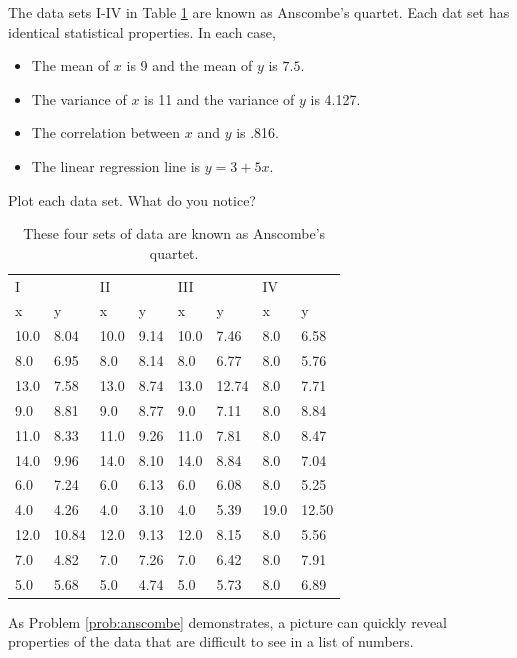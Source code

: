 \begin{problem}\label{prob:anscombe}
The data sets I-IV in Table \ref{table:anscombe} are known as Anscombe's quartet. 
Each dat set has identical statistical properties. 
In each case,
\begin{itemize}
\item The mean of $x$ is 9 and the mean of $y$ is $7.5$.
\item The variance of $x$ is 11 and the variance of $y$ is 4.127.
\item The correlation between $x$ and $y$ is .816.
\item The linear regression line is $y=3+5x$.
\end{itemize}
Plot each data set. What do you notice?

\begin{table}[H]
\begin{tabular}{l l  |  l l  |  l l  |  l l }
I & & II & & III & & IV\\
x & y & x & y & x & y & x & y \\
\hline
10.0 & 8.04 & 10.0 & 9.14 & 10.0 & 7.46 & 8.0 & 6.58 \\
8.0 & 6.95 & 8.0 & 8.14 & 8.0 & 6.77 & 8.0 & 5.76 \\
13.0 & 7.58 & 13.0 & 8.74 & 13.0 & 12.74 & 8.0 & 7.71 \\
9.0 & 8.81 & 9.0 & 8.77 & 9.0 & 7.11 & 8.0 & 8.84 \\
11.0 & 8.33 & 11.0 & 9.26 & 11.0 & 7.81 & 8.0 & 8.47 \\
14.0 & 9.96 & 14.0 & 8.10 & 14.0 & 8.84 & 8.0 & 7.04 \\
6.0 & 7.24 & 6.0 & 6.13 & 6.0 & 6.08 & 8.0 & 5.25 \\
4.0 & 4.26 & 4.0 & 3.10 & 4.0 & 5.39 & 19.0 & 12.50 \\
12.0 & 10.84 & 12.0 & 9.13 & 12.0 & 8.15 & 8.0 & 5.56 \\
7.0 & 4.82 & 7.0 & 7.26 & 7.0 & 6.42 & 8.0 & 7.91 \\
5.0 & 5.68 & 5.0 & 4.74 & 5.0 & 5.73 & 8.0 & 6.89 \\
\end{tabular}
\caption{These four sets of data are known as Anscombe's quartet.}
\label{table:anscombe}
\end{table}
\end{problem}

As Problem \ref{prob:anscombe} demonstrates, a picture can quickly reveal properties of the data that are difficult to see in a list of numbers.

